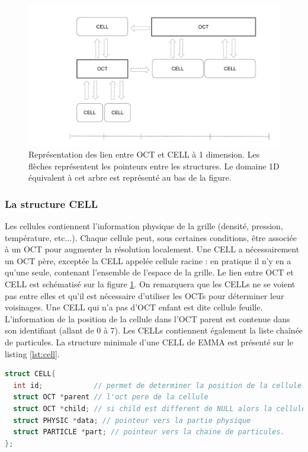 \begin{figure}
        \includegraphics[width=.95\linewidth]{img/02/octcell.pdf} 
        \caption[OCT et CELL]{Représentation des lien entre OCT et CELL à 1 dimension.
        Les flèches représentent les pointeurs entre les structures.
        Le domaine 1D équivalent à cet arbre est représenté au bas de la figure.
     	\label{fig:octcell}
}
\end{figure}


\subsubsection{La structure CELL}
\label{sec:CELL}
Les cellules contiennent l'information physique de la grille (densité, pression, température, etc...).
Chaque cellule peut, sous certaines conditions, être associée à un OCT pour augmenter la résolution localement.
Une CELL a nécessairement un OCT père, exceptée la CELL appelée cellule racine : en pratique il n'y en a qu'une seule, contenant l'ensemble de l'espace de la grille.
Le lien entre OCT et CELL est schématisé sur la figure \ref{fig:octcell}.
On remarquera que les CELLs ne se voient pas entre elles et qu'il est nécessaire d'utiliser les OCTs pour déterminer leur voisinages.
Une CELL qui n'a pas d'OCT enfant est dite cellule feuille.
L'information de la position de la cellule dans l'OCT parent est contenue dans son identifiant (allant de 0 à 7).
Les CELLs contiennent également la liste chaînée de particules.
La structure minimale d'une CELL de EMMA est présenté sur le listing \ref{lst:cell}.

\begin{lstlisting}[float=bth,language=C,frame=tb,caption={La structure CELL de EMMA},label=lst:cell]
struct CELL{
  int id;            // permet de determiner la position de la cellule dans l'oct
  struct OCT *parent // l'oct pere de la cellule
  struct OCT *child; // si child est different de NULL alors la cellule est raffinee et child point vers l'oct enfant
  struct PHYSIC *data; // pointeur vers la partie physique
  struct PARTICLE *part; // pointeur vers la chaine de particules.
};
\end{lstlisting}



